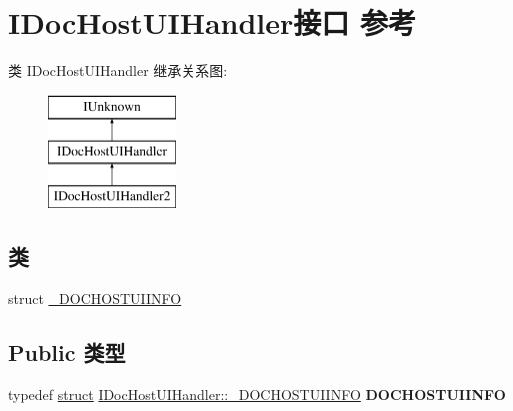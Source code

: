 \hypertarget{interface_i_doc_host_u_i_handler}{}\section{I\+Doc\+Host\+U\+I\+Handler接口 参考}
\label{interface_i_doc_host_u_i_handler}
类 I\+Doc\+Host\+U\+I\+Handler 继承关系图\+:\begin{figure}[H]
\begin{center}
\leavevmode
\includegraphics[height=3.000000cm]{interface_i_doc_host_u_i_handler}
\end{center}
\end{figure}
\subsection*{类}
\begin{DoxyCompactItemize}
\item 
struct \hyperlink{struct_i_doc_host_u_i_handler_1_1___d_o_c_h_o_s_t_u_i_i_n_f_o}{\+\_\+\+D\+O\+C\+H\+O\+S\+T\+U\+I\+I\+N\+FO}
\end{DoxyCompactItemize}
\subsection*{Public 类型}
\begin{DoxyCompactItemize}
\item 
\mbox{\label{interface_i_doc_host_u_i_handler_ac5ea47c22fe29db9c5942c256898693c}} 
typedef \hyperlink{interfacestruct}{struct} \hyperlink{struct_i_doc_host_u_i_handler_1_1___d_o_c_h_o_s_t_u_i_i_n_f_o}{I\+Doc\+Host\+U\+I\+Handler\+::\+\_\+\+D\+O\+C\+H\+O\+S\+T\+U\+I\+I\+N\+FO} {\bfseries D\+O\+C\+H\+O\+S\+T\+U\+I\+I\+N\+FO}
\end{DoxyCompactItemize}
